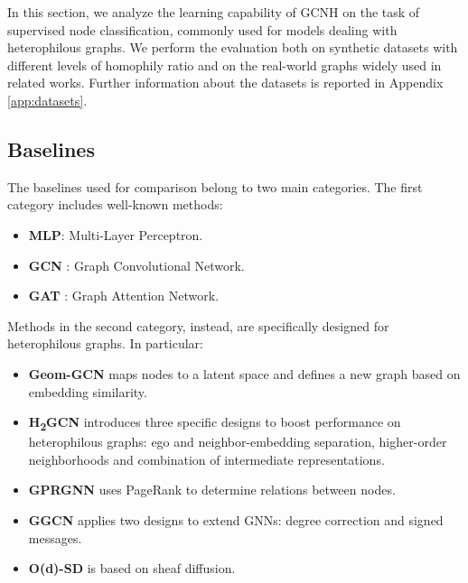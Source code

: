 \documentclass[conference]{IEEEtran}
\begin{document}
In this section, we analyze the learning capability of GCNH on the task of supervised node classification, commonly used for models dealing with heterophilous graphs. We perform the evaluation both on synthetic datasets with different levels of homophily ratio and on the real-world graphs widely used in related works. Further information about the datasets is reported in Appendix \ref{app:datasets}.


\subsection{Baselines}
The baselines used for comparison belong to two main categories. The first category includes well-known methods:
\begin{itemize}
    \item \textbf{MLP}: Multi-Layer Perceptron.
    \item \textbf{GCN} \cite{kipf_semi_2017}: Graph Convolutional Network.
    \item \textbf{GAT} \cite{velickovic_graph_2018}: Graph Attention Network.
\end{itemize}
Methods in the second category, instead, are specifically designed for heterophilous graphs. In particular:
\begin{itemize}
    \item \textbf{Geom-GCN} \cite{pei_geom-gcn_2019} maps nodes to a latent space and defines a new graph based on embedding similarity.
    \item \textbf{H\textsubscript{2}GCN} \cite{zhu_beyond_2020} introduces three specific designs to boost performance on heterophilous graphs: ego and neighbor-embedding separation, higher-order neighborhoods and combination of intermediate representations.
    \item \textbf{GPRGNN} \cite{chien_adaptive_2021} uses PageRank to determine relations between nodes.
    \item \textbf{GGCN} \cite{yan_two_2021} applies two designs to extend GNNs: degree correction and signed messages.
    \item \textbf{O(d)-SD} \cite{bodnar_neural_2022} is based on sheaf diffusion.
\end{itemize}
\end{document}
